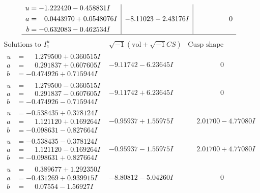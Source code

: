 \documentclass[1p]{elsarticle_modified}
\theoremstyle{definition}
\newcommand{\I}{\sqrt{-1}}
\begin{document}
$$\begin{array}{c|c|c}
\begin{aligned}
u &= -1.222420 - 0.458831 I \\
a &= \phantom{-}0.0443970 + 0.0548076 I \\
b &= -0.632083 - 0.462534 I\end{aligned}
 & -8.11023 - 2.43176 I & \phantom{-0.000000 } 0\\
 \hline 
 \end{array}$$\newpage$$\begin{array}{c|c|c}  
\text{Solutions to }I^u_{1}& \I (\text{vol} + \sqrt{-1}CS) & \text{Cusp shape}\\
 \hline 
\begin{aligned}
u &= \phantom{-}1.279500 + 0.360515 I \\
a &= \phantom{-}0.291837 + 0.607605 I \\
b &= -0.474926 + 0.715944 I\end{aligned}
 & -9.11742 - 6.23645 I & \phantom{-0.000000 } 0 \\ \hline\begin{aligned}
u &= \phantom{-}1.279500 - 0.360515 I \\
a &= \phantom{-}0.291837 - 0.607605 I \\
b &= -0.474926 - 0.715944 I\end{aligned}
 & -9.11742 + 6.23645 I & \phantom{-0.000000 } 0 \\ \hline\begin{aligned}
u &= -0.538435 + 0.378124 I \\
a &= \phantom{-}1.121120 + 0.169264 I \\
b &= -0.098631 - 0.827664 I\end{aligned}
 & -0.95937 + 1.55975 I & \phantom{-}2.01700 - 4.77080 I \\ \hline\begin{aligned}
u &= -0.538435 - 0.378124 I \\
a &= \phantom{-}1.121120 - 0.169264 I \\
b &= -0.098631 + 0.827664 I\end{aligned}
 & -0.95937 - 1.55975 I & \phantom{-}2.01700 + 4.77080 I \\ \hline\begin{aligned}
u &= \phantom{-}0.389677 + 1.292350 I \\
a &= -0.431269 + 0.939915 I \\
b &= \phantom{-}0.07554 - 1.56927 I\end{aligned}
 & -8.80812 - 5.04260 I & \phantom{-0.000000 } 0 \\ \hline\begin{aligned}

\end{aligned}
\end{array}$$
\end{document}

